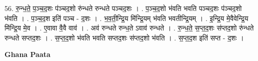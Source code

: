 \documentclass[17pt]{extarticle}
\begin{document}
56. रु॒न्ध॒ते॒ प॒ञ्च॒द॒शः प॑ञ्चद॒शो रु॑न्धते रुन्धते पञ्चद॒शः । . प॒ञ्च॒द॒शो भ॑वति भवति पञ्चद॒शः प॑ञ्चद॒शो भ॑वति । . प॒ञ्च॒द॒श इति॑ पञ्च - द॒शः । . भ॒व॒ती॒न्द्रि॒य मि॑न्द्रि॒यम् भ॑वति भवतीन्द्रि॒यम् । . इ॒न्द्रि॒य मे॒वैवेन्द्रि॒य मि॑न्द्रि॒य मे॒व । . ए॒वावा वै॒वै वाव॑ । . अव॑ रुन्धते रुन्ध॒ते ऽवाव॑ रुन्धते । . रु॒न्ध॒ते॒ स॒प्त॒द॒शः स॑प्तद॒शो रु॑न्धते रुन्धते सप्तद॒शः । . स॒प्त॒द॒शो भ॑वति भवति सप्तद॒शः स॑प्तद॒शो भ॑वति । . स॒प्त॒द॒श इति॑ सप्त - द॒शः । \newline

\textbf{Ghana Paata } \newline
\end{document}
